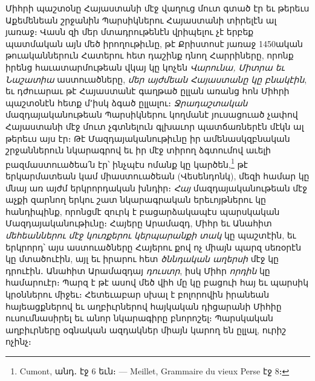 \documentclass{article}
\begin{document}
{Միհրի պաշտօնը Հայաստանի մէջ վաղուց մուտ գտած էր եւ թերեւս Աքեմենեան շրջանին Պարսիկներու Հայաստանի տիրելէն ալ յառաջ։ Վասն զի մեր մտադրութենէն վրիպելու չէ երբեք պատմական այն մեծ իրողութիւնը, թէ Քրիստոսէ յառաջ 1450ական թուականներուն Հատերու հետ դաշինք դնող Հարրիները, որոնք իրենց հաւատարմութեան վկայ կը կոչեն \emph{Վարունա, Միտրա եւ Նաշատիա} աստուածները, \emph{մեր այժմեան Հայաստանը կը բնակէին}, եւ դժուարաւ թէ Հայաստանէ գաղթած ըլլան առանց հոն Միհրի պաշտօնէն հետք մ՚իսկ ձգած ըլլալու։ \emph{Ջրադաշտական} մազդայականութեան Պարսիկներու կողմանէ յուսացուած չափով Հայաստանի մէջ մուտ չգտնելուն գլխաւոր պատճառներէն մէկն ալ թերեւս այս էր։ Թէ Մազդայականութիւնը իր ամենասկզբնական շրջաններուն նկարագրով եւ իր մէջ տիրող ձգտումով աւելի բազմաստուածեա՛ն էր՝ ինչպէս ոմանք կը կարծեն,\footnote{Cumont, անդ․ էջ 6 եւն։ — Meillet, Grammaire du vieux Perse էջ 8։} թէ երկարմատեան կամ միաստուածեան (Վեսենդոնկ), մեզի համար կը մնայ առ այժմ երկրորդական խնդիր։ \emph{Հայ} մազդայականութեան մէջ աչքի զարնող երկու շատ նկարագրական երեւոյթներու կը հանդիպինք, որոնցմէ զուրկ է բացարձակապէս պարսկական Մազդայականութիւնը։ Հայերը Արամազդ, Միհր եւ Անահիտ \emph{մեհեաններու մէջ կուռքերու կերպարանքի տակ} կը պաշտէին, եւ երկրորդ՝ այս աստուածները Հայերու քով ոչ միայն պարզ սեռօրէն կը մտածուէին, այլ եւ իրարու հետ \emph{ծննդական աղերսի} մէջ կը դրուէին․ Անահիտ Արամազդայ \emph{դուստր}, իսկ Միհր \emph{որդին} կը համարուէր։ Պարզ է թէ ասով մեծ վիհ մը կը բացուի հայ եւ պարսիկ կրօններու միջեւ։ Հետեւաբար սխալ է բոլորովին իրանեան հայեացքներով եւ աղբիւրներով հայկական դիցարանի Միհիը ուսումնասիրել եւ անոր նկարագիրը բնորոշել։ Պարսկական աղբիւրները օգնական ազդակներ միայն կարող են ըլլալ, ուրիշ ոչինչ։

}
\end{document}
